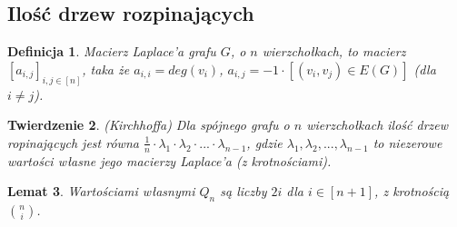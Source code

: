 \documentclass{pracamgr}
\newtheorem{theorem}{Twierdzenie}[chapter]
\newtheorem{defi}[theorem]{Definicja}
\newtheorem{lemma}[theorem]{Lemat}
\begin{document}
   \subsection{Ilość drzew rozpinających}
    \begin{defi}
     Macierz Laplace'a grafu $G$, o $n$ wierzchołkach, to macierz $[a_{i,j}]_{i,j\in[n]}$, taka że\newline
     $a_{i,i}=deg(v_i)$, $a_{i,j}=-1\cdot [(v_i,v_j)\in E(G)]$ (dla $i\neq j$).
    \end{defi}
    \begin{theorem}\label{Kirchhoff}
     (Kirchhoffa)\newline
     Dla spójnego grafu o $n$ wierzchołkach ilość drzew ropinających jest równa $\frac{1}{n}\cdot\lambda_1\cdot\lambda_2\cdot...\cdot\lambda_{n-1}$,
     gdzie $\lambda_1,\lambda_2,...,\lambda_{n-1}$ to niezerowe wartości własne jego macierzy Laplace'a (z krotnościami).
    \end{theorem}
    \begin{lemma}
     Wartościami własnymi $Q_n$ są liczby $2i$ dla $i\in[n+1]$, z krotnością ${n\choose i}$.
    \end{lemma}
\end{document}
